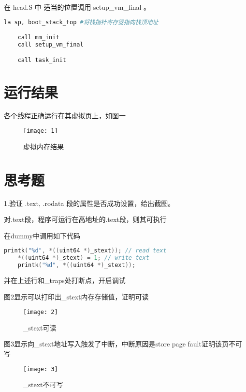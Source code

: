 \documentclass{source/Report}
\begin{document}
在 head.S 中 适当的位置调用 setup\_vm\_final 。  

\begin{lstlisting}[language = bash, title = {head.S调用}]
    la sp, boot_stack_top #将栈指针寄存器指向栈顶地址

    call mm_init
    call setup_vm_final

    call task_init
\end{lstlisting}



\section{运行结果}

各个线程正确运行在其虚拟页上，如图一

\begin{figure}[p]
    \centering
    \texttt{[image: 1]}
    \caption{虚拟内存结果}
\end{figure}

\section{思考题}

1.验证 .text, .rodata 段的属性是否成功设置，给出截图。

对.text段，程序可运行在高地址的.text段，则其可执行

在dummy中调用如下代码

\begin{lstlisting}[language = c, title = {测试代码}]
    printk("%d", *((uint64 *)_stext)); // read text
    *((uint64 *)_stext) = 1; // write text
    printk("%d", *((uint64 *)_stext));
\end{lstlisting}

并在上述行和\_traps处打断点，开启调试

图2显示可以打印出\_stext内存存储值，证明可读

\begin{figure}[p]
    \centering
    \texttt{[image: 2]}
    \caption{\_stext可读}
\end{figure}

图3显示向\_stext地址写入触发了中断，中断原因是store page fault证明该页不可写

\begin{figure}[p]
    \centering
    \texttt{[image: 3]}
    \caption{\_stext不可写}
\end{figure}
\end{document}
